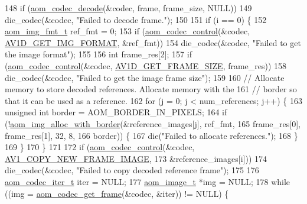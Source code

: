 \begin{DoxyCodeInclude}
{{{{148     \textcolor{keywordflow}{if} (\hyperlink{group__decoder_gab03fdb999d1f83a5896869a3ba5f68f7}{aom\_codec\_decode}(&codec, frame, frame\_size, NULL))
149       die\_codec(&codec, \textcolor{stringliteral}{"Failed to decode frame."});
150 
151     \textcolor{keywordflow}{if} (i == 0) \{
152       \hyperlink{aom__image_8h_ab71efff8c7f49380fad23b93bc2e9bfc}{aom\_img\_fmt\_t} ref\_fmt = 0;
153       \textcolor{keywordflow}{if} (\hyperlink{group__codec_ga6da974f4eeaba1fa74106b28d0fe6ac5}{aom\_codec\_control}(&codec, \hyperlink{group__aom__decoder_gga3865fd4b3192489baa9a5c3632ebe97bacd7229e5fb766670fe995739931c2ee3}{AV1D\_GET\_IMG\_FORMAT}, &ref\_fmt))
154         die\_codec(&codec, \textcolor{stringliteral}{"Failed to get the image format"});
155 
156       \textcolor{keywordtype}{int} frame\_res[2];
157       \textcolor{keywordflow}{if} (\hyperlink{group__codec_ga6da974f4eeaba1fa74106b28d0fe6ac5}{aom\_codec\_control}(&codec, \hyperlink{group__aom__decoder_gga3865fd4b3192489baa9a5c3632ebe97ba175c454a7adf2d3927a0e979b4a2b07b}{AV1D\_GET\_FRAME\_SIZE}, frame\_res))
158         die\_codec(&codec, \textcolor{stringliteral}{"Failed to get the image frame size"});
159 
160       \textcolor{comment}{// Allocate memory to store decoded references. Allocate memory with the}
161       \textcolor{comment}{// border so that it can be used as a reference.}
162       \textcolor{keywordflow}{for} (j = 0; j < num\_references; j++) \{
163         \textcolor{keywordtype}{unsigned} \textcolor{keywordtype}{int} border = AOM\_BORDER\_IN\_PIXELS;
164         \textcolor{keywordflow}{if} (!\hyperlink{aom__image_8h_aeb211e5184687f7e10d7c5bed4dcfdcd}{aom\_img\_alloc\_with\_border}(&reference\_images[j], ref\_fmt,
165                                        frame\_res[0], frame\_res[1], 32, 8,
166                                        border)) \{
167           die(\textcolor{stringliteral}{"Failed to allocate references."});
168         \}
169       \}
170     \}
171 
172     \textcolor{keywordflow}{if} (\hyperlink{group__codec_ga6da974f4eeaba1fa74106b28d0fe6ac5}{aom\_codec\_control}(&codec, \hyperlink{group__aom_gga9421a1fa78c0d9587ae5aa6c1cb3d659ae41763622ee33cd99e23ca8f78a3f8fa}{AV1\_COPY\_NEW\_FRAME\_IMAGE},
173                           &reference\_images[i]))
174       die\_codec(&codec, \textcolor{stringliteral}{"Failed to copy decoded reference frame"});
175 
176     \hyperlink{group__codec_gadf9e173c9e02788a9999399edab20a02}{aom\_codec\_iter\_t} iter = NULL;
177     \hyperlink{structaom__image}{aom\_image\_t} *img = NULL;
178     \textcolor{keywordflow}{while} ((img = \hyperlink{group__decoder_ga780aad27a2728abefab725faa3bc4f79}{aom\_codec\_get\_frame}(&codec, &iter)) != NULL) \{
}}}}
\end{DoxyCodeInclude}
